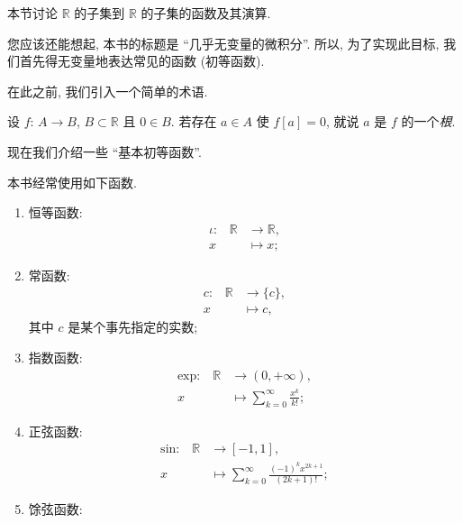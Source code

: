 本节讨论 $\mathbb{R}$ 的子集到 $\mathbb{R}$ 的子集的函数及其演算.

您应该还能想起, 本书的标题是 ``几乎无变量的微积分''. 所以, 为了实现此目标, 我们首先得无变量地表达常见的函数 (初等函数).

在此之前, 我们引入一个简单的术语.

\begin{definition}
    设 $f$: $A \to B$, $B \subset \mathbb{R}$ 且 $0 \in B$. 若存在 $a \in A$ 使 $f[a] = 0$, 就说 $a$ 是 $f$ 的一个\emph{根}.
\end{definition}

现在我们介绍一些 ``基本初等函数''.

\begin{definition}
    本书经常使用如下函数.
    \begin{enumerate}
        \item 恒等函数:
              \begin{align*}
                  \text{$\iota$:} \quad
                  \mathbb{R} & \to \mathbb{R}, \\
                  x          & \mapsto x;
              \end{align*}
        \item 常函数:
              \begin{align*}
                  \text{$c$:} \quad
                  \mathbb{R} & \to \{ c \}, \\
                  x          & \mapsto c,
              \end{align*}
              其中 $c$ 是某个事先指定的实数;
        \item 指数函数:
              \begin{align*}
                  \text{$\mathrm{exp}$:} \quad
                  \mathbb{R} & \to (0, +\infty),                               \\
                  x          & \mapsto \sum_{k = 0}^{\infty} {\frac{x^k}{k!}};
              \end{align*}
        \item 正弦函数:
              \begin{align*}
                  \text{$\mathrm{sin}$:} \quad
                  \mathbb{R} & \to [-1, 1],                                                     \\
                  x          & \mapsto \sum_{k = 0}^{\infty} {\frac{(-1)^k x^{2k+1}}{(2k+1)!}};
              \end{align*}
        \item 馀弦函数:

\end{enumerate}
\end{definition}
